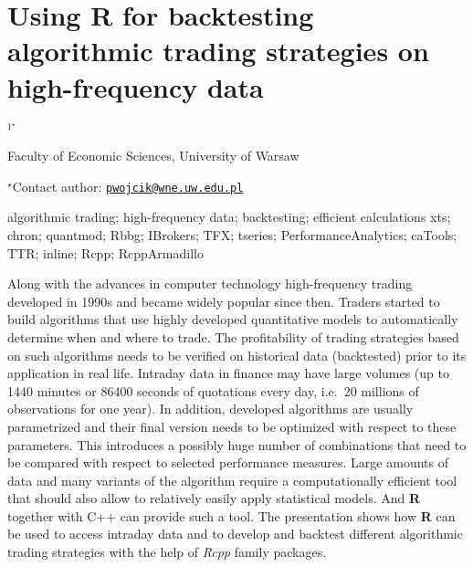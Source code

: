\documentclass[\main/boa.tex]{subfiles}
\begin{document}
\section{Using R for backtesting algorithmic trading strategies on high-frequency
data}

\begin{center}
  {\bf {}$^{1^\star}$}
\end{center}

\vskip 0.3cm

\begin{affiliations}
\begin{enumerate}
\begin{minipage}{0.915\textwidth}
\centering
\item Faculty of Economic Sciences, University of Warsaw \\[-2pt]
\end{minipage}
\end{enumerate}
$^\star$Contact author: \href{mailto:pwojcik@wne.uw.edu.pl}{\nolinkurl{pwojcik@wne.uw.edu.pl}}\\
\end{affiliations}

\vskip 0.5cm

\begin{minipage}{0.915\textwidth}
\keywords algorithmic trading; high-frequency data; backtesting; efficient
calculations
\packages xts; chron; quantmod; Rbbg; IBrokers; TFX; tseries;
PerformanceAnalytics; caTools; TTR; inline; Rcpp; RcppArmadillo
\end{minipage}

\vskip 0.8cm

Along with the advances in computer technology high-frequency trading
developed in 1990s and became widely popular since then. Traders started
to build algorithms that use highly developed quantitative models to
automatically determine when and where to trade. The profitability of
trading strategies based on such algorithms needs to be verified on
historical data (backtested) prior to its application in real life.
Intraday data in finance may have large volumes (up to 1440 minutes or
86400 seconds of quotations every day, i.e.~20 millions of observations
for one year). In addition, developed algorithms are usually
parametrized and their final version needs to be optimized with respect
to these parameters. This introduces a possibly huge number of
combinations that need to be compared with respect to selected
performance measures. Large amounts of data and many variants of the
algorithm require a computationally efficient tool that should also
allow to relatively easily apply statistical models. And \textbf{R}
together with C++ can provide such a tool. The presentation shows how
\textbf{R} can be used to access intraday data and to develop and
backtest different algorithmic trading strategies with the help of
\emph{Rcpp} family packages.
\end{document}
